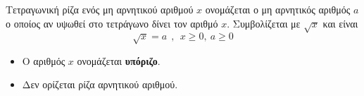 Τετραγωνική ρίζα ενός μη αρνητικού αριθμού $x$ ονομάζεται ο μη αρνητικός αριθμός $a$ ο οποίος αν υψωθεί στο τετράγωνο δίνει τον αριθμό $ x $. Συμβολίζεται με $ \sqrt{x} $ και είναι
\[ \sqrt{x}=a\ \ ,\ \ x\geq 0,\ a\geq 0 \]
\begin{itemize}[itemsep=0mm]
\item Ο αριθμός $ x $ ονομάζεται \textbf{υπόριζο}.
\item Δεν ορίζεται ρίζα αρνητικού αριθμού.
\end{itemize}
